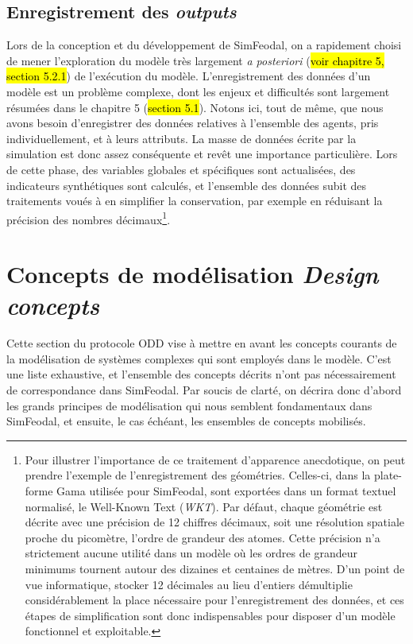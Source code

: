 \subsection{Enregistrement des \textit{outputs} \label{meca-outputs}}

Lors de la conception et du développement de SimFeodal, on a rapidement choisi de mener l'exploration du modèle très largement \textit{a posteriori} (\hl{voir chapitre 5, section 5.2.1}) de l'exécution du modèle.
L'enregistrement des données d'un modèle est un problème complexe, dont les enjeux et difficultés sont largement résumées dans le chapitre 5 (\hl{section 5.1}).
Notons ici, tout de même, que nous avons besoin d'enregistrer des données relatives à l'ensemble des agents, pris individuellement, et à leurs attributs.
La masse de données écrite par la simulation est donc assez conséquente et revêt une importance particulière.
Lors de cette phase, des variables globales et spécifiques sont actualisées, des indicateurs synthétiques sont calculés, et l'ensemble des données subit des traitements voués à en simplifier la conservation, par exemple en réduisant la précision des nombres décimaux\footnote{
Pour illustrer l'importance de ce traitement d'apparence anecdotique, on peut prendre l'exemple de l'enregistrement des géométries.
Celles-ci, dans la plate-forme Gama \autocite{taillandier_building_2018} utilisée pour SimFeodal, sont exportées dans un format textuel normalisé, le \og Well-Known Text\fg{} (\textit{WKT}).
Par défaut, chaque géométrie est décrite avec une précision de 12 chiffres décimaux, soit une résolution spatiale proche du picomètre, l'ordre de grandeur des atomes.
Cette précision n'a strictement aucune utilité dans un modèle où les ordres de grandeur minimums tournent autour des dizaines et centaines de mètres.
D'un point de vue informatique, stocker 12 décimales au lieu d'entiers démultiplie considérablement la place nécessaire pour l'enregistrement des données, et ces étapes de simplification sont donc indispensables pour disposer d'un modèle fonctionnel et exploitable.
}.

\section[Concepts de modélisation-- \textit{Design concepts}]{Concepts de modélisation \protect\newline \large{\textit{Design concepts}} }

Cette section du protocole ODD vise à mettre en avant les concepts courants de la modélisation de systèmes complexes qui sont employés dans le modèle.
C'est une liste exhaustive, et l'ensemble des concepts décrits n'ont pas nécessairement de correspondance dans SimFeodal.
Par soucis de clarté, on décrira donc d'abord les grands principes de modélisation qui nous semblent fondamentaux dans SimFeodal, et ensuite, le cas échéant, les ensembles de concepts mobilisés.

